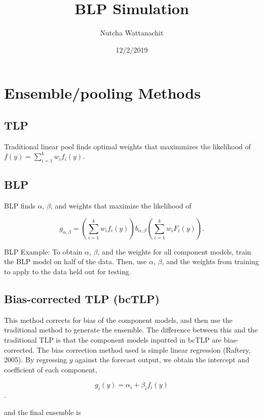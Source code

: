 \documentclass[]{article}
\title{BLP Simulation}
\author{Nutcha Wattanachit}
\date{12/2/2019}
\begin{document}
\maketitle

\hypertarget{ensemblepooling-methods}{%
\section{Ensemble/pooling Methods}\label{ensemblepooling-methods}}

\hypertarget{tlp}{%
\subsection{TLP}\label{tlp}}

Traditional linear pool finds optimal weights that maximmizes the
likelihood of \(f(y)=\sum_{i=1}^k w_if_i(y)\).

\hypertarget{blp}{%
\subsection{BLP}\label{blp}}

BLP finds \(\alpha\), \(\beta\), and weights that maximize the
likelihood of

\[g_{\alpha,\beta}=(\sum_{i=1}^k w_if_i(y))b_{\alpha,\beta}(\sum_{i=1}^k w_iF_i(y)).\]

BLP Example: To obtain \(\alpha\), \(\beta\), and the weights for all
component models, train the BLP model on half of the data. Then, use
\(\alpha\), \(\beta\), and the weights from training to apply to the
data held out for testing.

\hypertarget{bias-corrected-tlp-bctlp}{%
\subsection{Bias-corrected TLP (bcTLP)}\label{bias-corrected-tlp-bctlp}}

This method corrects for bias of the component models, and then use the
traditional method to generate the ensemble. The difference between this
and the traditional TLP is that the component models inputted in bcTLP
are bias-corrected. The bias correction method used is simple linear
regression (Raftery, 2005). By regressing \(y\) against the forecast
output, we obtain the intercept and coefficient of each component,

\[g_i(y)=\alpha_i+\beta_if_i(y)\].

and the final ensemble is
\end{document}
